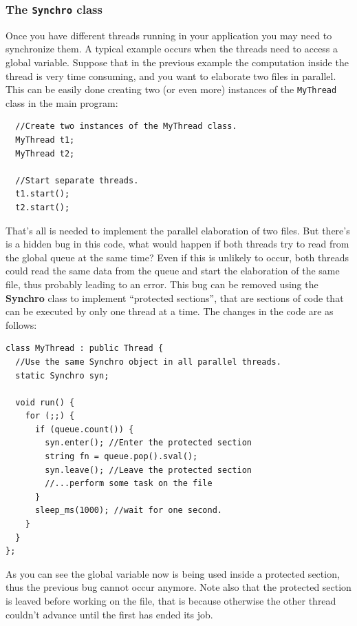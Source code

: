 \documentclass[12pt,titlepage]{article}
\begin{document}
\subsubsection{The \texttt{Synchro} class}
\label{sec:The Synchro class}
Once you have different threads running in your application you may
need to synchronize them. A typical example occurs when the threads
need to access a global variable. Suppose that in the previous
example the computation inside the thread is very time consuming, and
you want to elaborate two files in parallel. This can be easily done
creating two (or even more) instances of the \verb|MyThread| class in
the main program:

\begin{lstlisting}
  //Create two instances of the MyThread class.
  MyThread t1;
  MyThread t2;

  //Start separate threads.
  t1.start();
  t2.start();
\end{lstlisting}

\noindent
That's all is needed to implement the parallel elaboration of two
files. But there's is a hidden bug in this code, what would happen if
both threads try to read from the global queue at the same time?
Even if this is unlikely to occur, both threads could read the same
data from the queue and start the elaboration of the same file, thus
probably leading to an error. This bug can be removed using the
\textbf{Synchro} class to implement ``protected sections'', that are
sections of code that can be executed by only one thread at a time. The
changes in the code are as follows:

\begin{lstlisting}
class MyThread : public Thread {
  //Use the same Synchro object in all parallel threads.
  static Synchro syn;

  void run() {
    for (;;) {
      if (queue.count()) {
        syn.enter(); //Enter the protected section
        string fn = queue.pop().sval();
        syn.leave(); //Leave the protected section
        //...perform some task on the file
      }
      sleep_ms(1000); //wait for one second.
    }
  }
};
\end{lstlisting}

\noindent
As you can see the global variable now is being used inside a
protected section, thus the previous bug cannot occur anymore. Note
also that the protected section is leaved before working on the file,
that is because otherwise the other thread couldn't advance until
the first has ended its job.
\end{document}
